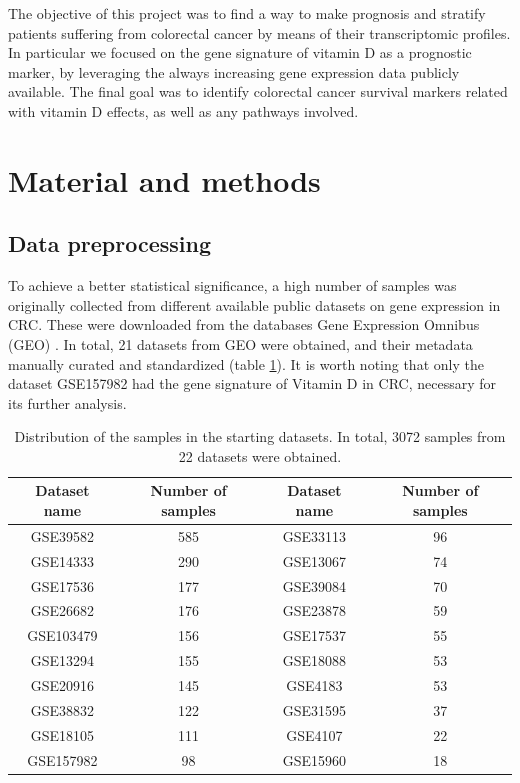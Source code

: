 \documentclass[fleqn,10pt]{SelfArx} %
\begin{document}
	The objective of this project was to find a way to make prognosis and stratify patients suffering from colorectal cancer by means of their transcriptomic profiles. In particular we focused on the gene signature of vitamin D as a prognostic marker, by leveraging the always increasing gene expression data publicly available. The final goal was to identify colorectal cancer survival markers related with vitamin D effects, as well as any pathways involved.


\section{Material and methods}
	\subsection{Data preprocessing}
		To achieve a better statistical significance, a high number of samples was originally collected from different available public datasets on gene expression in CRC. These were downloaded from the databases Gene Expression Omnibus (GEO) \cite{GEO} . In total, 21 datasets from GEO were obtained, and their metadata manually curated and standardized (table \ref{tab:datasets}). It is worth noting that only the dataset GSE157982 had the gene signature of Vitamin D in CRC, necessary for its further analysis.

		\begin{table}[ht]
		    \centering
		    \begin{tabular}{cccc}
		        \hline
		        Dataset name & Number of samples & Dataset name & Number of samples\\
		        \hline
		        GSE39582 & 585 & GSE33113 & 96 \\
		        GSE14333 & 290 & GSE13067 & 74 \\
		        GSE17536 & 177 & GSE39084 & 70 \\
		        GSE26682 & 176 & GSE23878 & 59 \\
		        GSE103479 & 156 & GSE17537 & 55 \\
		        GSE13294 & 155 & GSE18088 & 53 \\
		        GSE20916 & 145 & GSE4183 & 53 \\
		        GSE38832 & 122 & GSE31595 & 37 \\
		        GSE18105 & 111 & GSE4107 & 22 \\
		        GSE157982 & 98 & GSE15960 & 18 \\
		        \hline
		    \end{tabular}
		    \caption{Distribution of the samples in the starting datasets. In total, 3072 samples from 22 datasets were obtained.}
		    \label{tab:datasets}
		\end{table}
\end{document}
